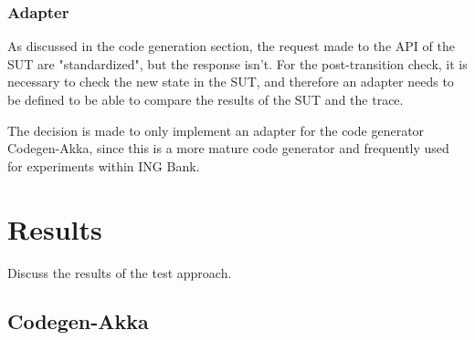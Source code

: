 \subsubsection{Adapter}
As discussed in the code generation section, the request made to the API of the
SUT are "standardized", but the response isn't. For the post-transition check,
it is necessary to check the new state in the SUT, and therefore an adapter
needs to be defined to be able to compare the results of the SUT and the trace.

The decision is made to only implement an adapter for the code generator
Codegen-Akka, since this is a more mature code generator and frequently used for
experiments within ING Bank.




\section{Results}
Discuss the results of the test approach.

\subsection{Codegen-Akka}


